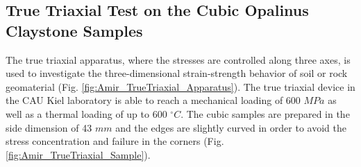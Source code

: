 \subsection{True Triaxial Test on the Cubic Opalinus Claystone Samples}
\label{sec:True_Triaxial_Exp}

The true triaxial apparatus, where the stresses are controlled along three axes, is used to investigate the three-dimensional strain-strength behavior of soil or rock geomaterial (Fig. \ref{fig:Amir_TrueTriaxial_Apparatus}). The true triaxial device in the CAU Kiel laboratory is able to reach a mechanical loading of 600 $MPa$ as well as a thermal loading of up to 600 $^{\circ}C$. The cubic samples are prepared in the side dimension of 43 $mm$ and the edges are slightly curved in order to avoid the stress concentration and failure in the corners (Fig. \ref{fig:Amir_TrueTriaxial_Sample}).


